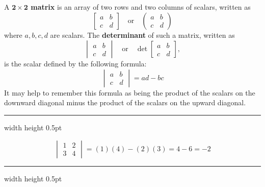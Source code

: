 A \textbf{$\bm{2 \times 2}$ matrix} is an array of two rows and two columns of scalars, written as
\begin{displaymath}
 \begin{bmatrix}
  a & b\\
  c & d
 \end{bmatrix}
 \quad\text{or}\quad
 \begin{pmatrix}
  a & b\\
  c & d
 \end{pmatrix}
\end{displaymath}
where $a, b, c, d$ are scalars. The \textbf{determinant} of such a matrix, written as
\begin{displaymath}
 \begin{vmatrix}
  a & b\\
  c & d
 \end{vmatrix}
 \quad\text{or}\quad
 \det \begin{bmatrix}
  a & b\\
  c & d
 \end{bmatrix},
\end{displaymath}
is the scalar defined by the following formula:
\begin{displaymath}
 \begin{vmatrix}
  a & b\\
  c & d
 \end{vmatrix}
 = ad - bc
\end{displaymath}
It may help to remember this formula as being the product of the scalars on the downward diagonal minus the product of
the scalars on the upward diagonal.

\vspace{3mm}
\hrule width \textwidth height 0.5pt
\begin{exmp}
 \begin{displaymath}
  \begin{vmatrix}
   1 & 2\\
   3 & 4
  \end{vmatrix}
  = (1)(4) - (2)(3) = 4 - 6 = -2
 \end{displaymath}
\end{exmp}
\hrule width \textwidth height 0.5pt
\vspace{3mm}

